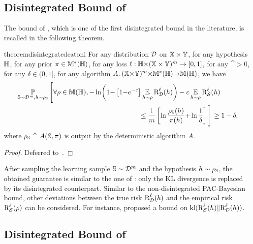 \subsection{Disintegrated Bound of \citet{Catoni2007}}

The bound of \citet[Theorem 1.2.7]{Catoni2007}, which is one of the first disintegrated bound in the literature, is recalled in the following theorem.

\begin{restatable}{theorem}{disintegratedcatoni}\label{chap:pac-bayes:theorem:disintegrated-catoni}
For any distribution $\mathcal{D}$ on $\mathbb{X}\times\mathbb{Y}$, for any hypothesis $\mathbb{H}$, for any prior $\pi\in\mathbb{M}^{*}(\mathbb{H})$, for any loss $\ell: \mathbb{H}{\times}(\mathbb{X}\times\mathbb{Y})^m \to [0, 1]$, for any $\cat>0$, for any $\delta\in(0, 1]$, for any algorithm \mbox{$A\!:\!(\mathbb{X}{\times}\mathbb{Y})^{m}{\times}\mathbb{M}^{*}(\mathbb{H}){\to} \mathbb{M}(\mathbb{H})$}, we have
\begin{align*}
    \PP_{\S\sim\D^\m,\h\sim\AQ}\Bigg[ \forall\Q\in\M(\H), 
    -\ln\!\LP 1{-}\LB1{-}e^{{-}\cat}\RB\EE_{\h\sim\Q}\RiskLoss_{\D}(\h)\RP&-\cat\EE_{\h\sim\Q}\RiskLoss_{\dS}(\h)\\
    &\hspace{-2cm}\le \frac{1}{\m}\LB\ln\frac{\AQ(\h)}{\P(\h)}{+}\ln\frac{1}{\delta}\RB\Bigg] \ge 1-\delta,
\end{align*}
where $\rho_{\mathbb{S}} \triangleq A(\mathbb{S}, \pi)$ is output by the deterministic algorithm $A$.
\end{restatable}
\begin{noaddcontents}\begin{proof}
Deferred to~.
\end{proof}\end{noaddcontents}

After sampling the learning sample $\mathbb{S}\sim\mathcal{D}^m$ and the hypothesis $h\sim\rho_{\mathbb{S}}$, the obtained guarantee is similar to the one of : only the KL divergence is replaced by its disintegrated counterpart.
Similar to the non-disintegrated PAC-Bayesian bound, other deviations between the true risk $\text{R}^{\ell}_{\mathcal{D}}(h)$ and the empirical risk $\text{R}^{\ell}_{\mathcal{S}}(\rho)$ can be considered.
For instance, \citet{BlanchardFleuret2007} proposed a bound on $\operatorname{kl}(\text{R}^{\ell}_{\mathcal{S}}(h)\|\text{R}^{\ell}_{\mathcal{D}}(h))$. 

\subsection{Disintegrated Bound of \citet{BlanchardFleuret2007}}

